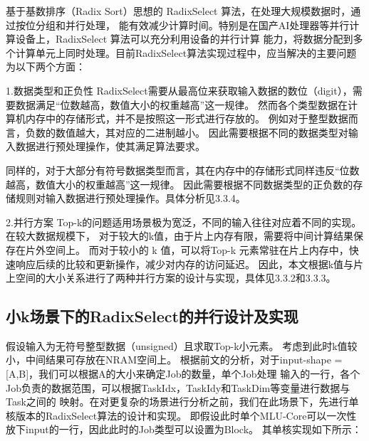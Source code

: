 基于基数排序（Radix Sort）思想的 RadixSelect 算法，在处理大规模数据时，通过按位分组和并行处理，
能有效减少计算时间。特别是在国产AI处理器等并行计算设备上，RadixSelect 算法可以充分利用设备的并行计算
能力，将数据分配到多个计算单元上同时处理。目前RadixSelect算法实现过程中，应当解决的主要问题为以下两个方面：

1.数据类型和正负性
    RadixSelect需要从最高位来获取输入数据的数位（digit），需要数据满足“位数越高，数值大小的权重越高”这一规律。
    然而各个类型数据在计算机内存中的存储形式，并不是按照这一形式进行存放的。
    例如对于整型数据而言，负数的数值越大，其对应的二进制越小。
    因此需要根据不同的数据类型对输入数据进行预处理操作，使其满足算法要求。
    
    同样的，对于大部分有符号数据类型而言，其在内存中的存储形式同样违反“位数越高，数值大小的权重越高”这一规律。
    因此需要根据不同数据类型的正负数的存储规则对输入数据进行预处理操作。具体分析见3.3.4。

2.并行方案
    Top-k的问题适用场景极为宽泛，不同的输入往往对应着不同的实现。在较大数据规模下，
    对于较大的k值，由于片上内存有限，需要将中间计算结果保存在片外空间上。
    而对于较小的 k 值，可以将Top-k 元素常驻在片上内存中，快速响应后续的比较和更新操作，减少对内存的访问延迟。
    因此，本文根据k值与片上空间的大小关系进行了两种并行方案的设计与实现，具体见3.3.2和3.3.3。



\subsection{小k场景下的RadixSelect的并行设计及实现}
假设输入为无符号整型数据（unsigned）且求取Top-k小元素。
考虑到此时k值较小，中间结果可存放在NRAM空间上。
  根据前文的分析，对于input-shape = [A,B]，我们可以根据A的大小来确定Job的数量，单个Job处理
  输入的一行，各个Job负责的数据范围，可以根据TaskIdx，TaskIdy和TaskDim等变量进行数据与Task之间的
  映射。在对更复杂的场景进行分析之前，我们在此场景下，先进行单核版本的RadixSelect算法的设计和实现。
  即假设此时单个MLU-Core可以一次性放下input的一行，因此此时的Job类型可以设置为Block。
  其单核实现如下所示：
